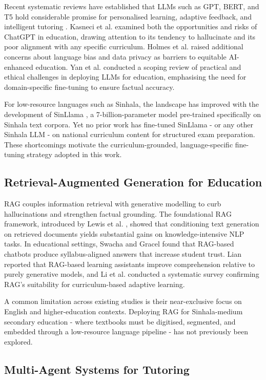 \documentclass[conference]{IEEEtran}
\begin{document}
Recent systematic reviews have established that LLMs such as GPT, BERT, and T5 hold considerable promise for personalised learning, adaptive feedback, and intelligent tutoring \cite{b22}. Kasneci et al. \cite{b23} examined both the opportunities and risks of ChatGPT in education, drawing attention to its tendency to hallucinate and its poor alignment with any specific curriculum. Holmes et al. \cite{b24} raised additional concerns about language bias and data privacy as barriers to equitable AI-enhanced education. Yan et al. \cite{b25} conducted a scoping review of practical and ethical challenges in deploying LLMs for education, emphasising the need for domain-specific fine-tuning to ensure factual accuracy.

For low-resource languages such as Sinhala, the landscape has improved with the development of SinLlama \cite{b7}, a 7-billion-parameter model pre-trained specifically on Sinhala text corpora. Yet no prior work has fine-tuned SinLlama - or any other Sinhala LLM - on national curriculum content for structured exam preparation. These shortcomings motivate the curriculum-grounded, language-specific fine-tuning strategy adopted in this work.

\subsection{Retrieval-Augmented Generation for Education}

RAG couples information retrieval with generative modelling to curb hallucinations and strengthen factual grounding. The foundational RAG framework, introduced by Lewis et al. \cite{b26}, showed that conditioning text generation on retrieved documents yields substantial gains on knowledge-intensive NLP tasks. In educational settings, Swacha and Gracel \cite{b27} found that RAG-based chatbots produce syllabus-aligned answers that increase student trust. Lian \cite{b28} reported that RAG-based learning assistants improve comprehension relative to purely generative models, and Li et al. \cite{b29} conducted a systematic survey confirming RAG's suitability for curriculum-based adaptive learning.

A common limitation across existing studies is their near-exclusive focus on English and higher-education contexts. Deploying RAG for Sinhala-medium secondary education - where textbooks must be digitised, segmented, and embedded through a low-resource language pipeline - has not previously been explored.

\subsection{Multi-Agent Systems for Tutoring}
\end{document}
